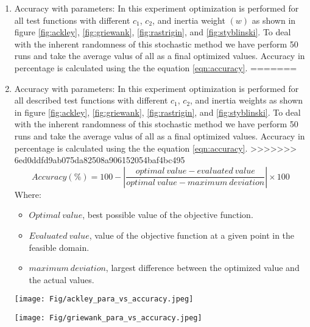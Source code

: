 \documentclass[paper,revised]{geophysics}
\begin{document}
\begin{enumerate}
<<<<<<< HEAD
	\item Accuracy with parameters: In this experiment optimization is performed for all test functions with different \(c_1\), \(c_2\), and inertia weight \((w)\) as shown in figure \ref{fig:ackley}, \ref{fig:griewank}, \ref{fig:rastrigin}, and \ref{fig:styblinski}. To deal with the inherent randomness of this stochastic method we have perform 50 runs and take the average valus of all as a final optimized values. Accuracy in percentage is calculated using the the equation \ref{eqn:accuracy}.
=======
	\item Accuracy with parameters: In this experiment optimization is performed for all described test functions with different \(c_1\), \(c_2\), and inertia weights as shown in figure \ref{fig:ackley}, \ref{fig:griewank}, \ref{fig:rastrigin}, and \ref{fig:styblinski}. To deal with the inherent randomness of this stochastic method we have perform 50 runs and take the average valus of all as a final optimized values. Accuracy in percentage is calculated using the the equation \ref{eqn:accuracy}.
>>>>>>> 6ed0ddfd9ab075da82508a906152054baf4bc495
	\begin{equation}
		Accuracy (\%) = 100 - \left| \frac{optimal \ value - evaluated \ value}{optimal \ value - maximum \ deviation} \right| \times 100
		\label{eqn:accuracy}
	\end{equation}
Where:
\begin{itemize}
	\item \(Optimal \  value\), best possible value of the objective function.
	\item \(Evaluated \ value\), value of the objective function at a given point in the feasible domain.
	\item \(maximum \ deviation\), largest difference between the optimized value and the actual values.
\end{itemize}
	\begin{sidewaysfigure}	
		\texttt{[image: Fig/ackley\_para\_vs\_accuracy.jpeg]}
		\caption{Optimization of the Ackley function with varying inertia weights, \(c_1\), and \(c_2\) coefficients.}
		\label{fig:ackley}
	\end{sidewaysfigure} 
	\begin{sidewaysfigure}	
		\texttt{[image: Fig/griewank\_para\_vs\_accuracy.jpeg]}
		\caption{Optimization of the Griewank function with varying inertia weights, \(c_1\), and \(c_2\) coefficients.}
		\label{fig:griewank}
	\end{sidewaysfigure} 

\end{enumerate}
\end{document}
